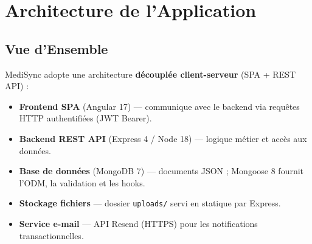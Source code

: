 \documentclass[12pt,a4paper]{report}
\begin{document}
\chapter{Architecture de l'Application}

\section{Vue d'Ensemble}

MediSync adopte une architecture \textbf{découplée client-serveur} (SPA + REST API) :

\begin{itemize}[leftmargin=*,itemsep=2pt]
  \item \textbf{Frontend SPA} (Angular 17) — communique avec le backend via requêtes HTTP authentifiées (JWT Bearer).
  \item \textbf{Backend REST API} (Express 4 / Node 18) — logique métier et accès aux données.
  \item \textbf{Base de données} (MongoDB 7) — documents JSON ; Mongoose 8 fournit l'ODM, la validation et les hooks.
  \item \textbf{Stockage fichiers} — dossier \texttt{uploads/} servi en statique par Express.
  \item \textbf{Service e-mail} — API Resend (HTTPS) pour les notifications transactionnelles.
\end{itemize}

\vspace{0.4cm}
\end{document}

